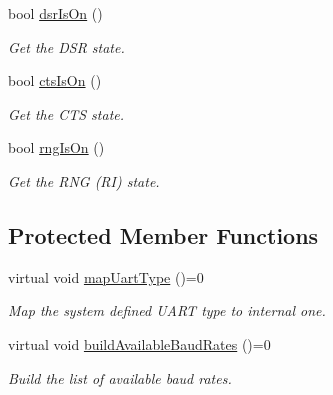 \begin{DoxyCompactItemize}
bool \hyperlink{classmdt_abstract_serial_port_a76816aa53a6dce0ab30b9f1d095dd045}{dsr\-Is\-On} ()
\begin{DoxyCompactList}\small\item\em Get the D\-S\-R state. \end{DoxyCompactList}\item 
bool \hyperlink{classmdt_abstract_serial_port_a9bea314eefd6f4ec79456bc21e6c66af}{cts\-Is\-On} ()
\begin{DoxyCompactList}\small\item\em Get the C\-T\-S state. \end{DoxyCompactList}\item 
bool \hyperlink{classmdt_abstract_serial_port_a0a3954438d1e8180e53717cc0fe1ce3e}{rng\-Is\-On} ()
\begin{DoxyCompactList}\small\item\em Get the R\-N\-G (R\-I) state. \end{DoxyCompactList}\end{DoxyCompactItemize}
\subsection*{Protected Member Functions}
\begin{DoxyCompactItemize}
\item 
virtual void \hyperlink{classmdt_abstract_serial_port_abbc98ff6721f120d68b43078e90b1195}{map\-Uart\-Type} ()=0
\begin{DoxyCompactList}\small\item\em Map the system defined U\-A\-R\-T type to internal one. \end{DoxyCompactList}\item 
virtual void \hyperlink{classmdt_abstract_serial_port_a6241c9f53d60fd477e2375bd5b36073f}{build\-Available\-Baud\-Rates} ()=0
\begin{DoxyCompactList}\small\item\em Build the list of available baud rates. \end{DoxyCompactList}\end{DoxyCompactItemize}
